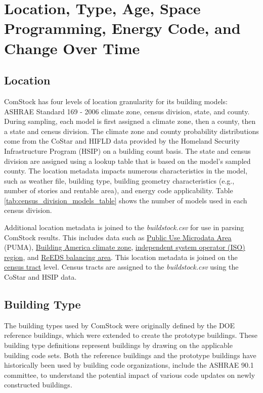 \section{Location, Type, Age, Space Programming, Energy Code, and Change Over Time}
\subsection{Location}

ComStock has four levels of location granularity for its building models: ASHRAE Standard 169 - 2006 climate zone, census division, state, and county. During sampling, each model is first assigned a climate zone, then a county, then a state and census division. The climate zone and county probability distributions come from the CoStar and HIFLD data provided by the Homeland Security Infrastructure Program (HSIP) on a building count basis. The state and census division are assigned using a lookup table that is based on the model's sampled county. The location metadata impacts numerous characteristics in the model, such as weather file, building type, building geometry characteristics (e.g., number of stories and rentable area), and energy code applicability. Table  \ref{tab:census_division_models_table} shows the number of models used in each census division.

Additional location metadata is joined to the \emph{buildstock.csv} for use in parsing ComStock results. This includes data such as \href{https://www.census.gov/programs-surveys/geography/guidance/geo-areas/pumas.html}{Public Use Microdata Area} (PUMA), \href{https://www.energy.gov/eere/buildings/building-america-climate-specific-guidance}{Building America climate zone}, \href{https://isorto.org/}{independent system operator (ISO) region}, and \href{https://www.nrel.gov/analysis/reeds}{ReEDS balancing area}. This location metadata is joined on the \href{https://www2.census.gov/geo/pdfs/education/CensusTracts.pdf}{census tract} level. Census tracts are assigned to the \emph{buildstock.csv} using the CoStar and HSIP data.



\subsection{Building Type} 
\label{sec:building_type_meta}

The building types used by ComStock were originally defined by the DOE reference buildings, which were extended to create the prototype buildings. These building type definitions represent buildings by drawing on the applicable building code sets. Both the reference buildings and the prototype buildings have historically been used by building code organizations, include the ASHRAE 90.1 committee, to understand the potential impact of various code updates on newly constructed buildings.

